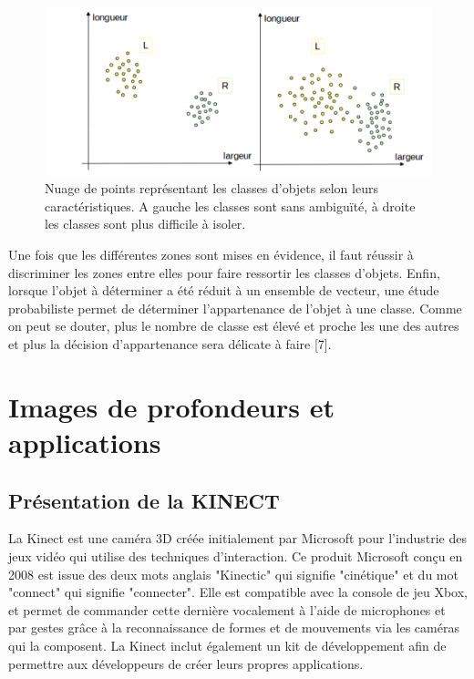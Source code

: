 \documentclass[12pt,a4paper,oneside]{book}
\begin{document}
	\begin{figure}[H]
		\centering
		\includegraphics[scale=1]{chaptre1.png}
		\caption{Nuage de points représentant les classes d’objets selon leurs caractéristiques.
			A gauche les classes sont sans ambiguïté, à droite les classes sont plus difficile à isoler.}
		\label{fig1n}
	\end{figure}
	
	Une fois que les différentes zones sont mises en évidence, il faut réussir à discriminer les zones entre elles pour faire ressortir les classes d’objets. Enfin, lorsque l’objet à déterminer a été réduit à un ensemble de vecteur, une étude probabiliste permet de déterminer l’appartenance de l’objet à une classe. Comme on peut se douter, plus le nombre de classe est élevé et proche	les une des autres et plus la décision d’appartenance sera délicate à faire [7].
	
	\section{Images de profondeurs et applications}
	
	\subsection{Présentation de la KINECT}
	La Kinect est une caméra 3D créée initialement par Microsoft pour l’industrie des jeux vidéo qui utilise des techniques d'interaction. Ce produit Microsoft conçu en 2008 est issue des deux mots anglais "Kinectic" qui signifie "cinétique" et du mot "connect" qui signifie "connecter". Elle est compatible avec la console de jeu Xbox, et permet de commander cette dernière vocalement à l’aide de microphones et par gestes grâce à la reconnaissance de formes et de mouvements via les caméras qui la composent.
	La Kinect inclut également un kit de développement afin de permettre aux développeurs de créer leurs propres applications.
	
\end{document}
